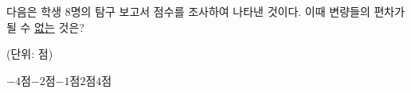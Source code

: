 다음은 학생 8명의 탐구 보고서 점수를 조사하여 나타낸 것이다. 이때 변량들의 편차가 될 수 \underline{없는} 것은?\par\noindent\hfill{\footnotesize (단위: 점)}
\begin{choices32}{$-4$점}{$-2$점}{$-1$점}{$2$점}{$4$점}\end{choices32}
